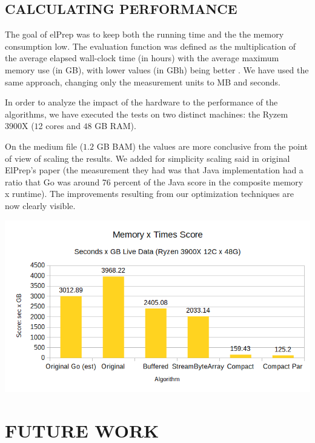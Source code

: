 \documentclass[a4paper,twoside]{article}
\begin{document}
 
\subsection{\uppercase{Calculating Performance}}
\label{subsec:performance}
The goal of elPrep was to keep both the running time and the the memory consumption low. The evaluation function was defined as the multiplication of the average elapsed wall-clock time (in hours) with the average maximum memory use (in GB), with lower values (in GBh) being better \cite{costanza:2019}.
We have used the same approach, changing only the measurement units to MB and seconds.

In order to analyze the impact of the hardware to the performance of the algorithms, we have executed the tests on two distinct machines: the Ryzem 3900X ($1$2 cores and $48$ GB RAM).

On the medium file ($1.2$ GB BAM) the values are more conclusive from the point of view of scaling the results. We added for simplicity scaling said in original ElPrep's paper (the measurement they had was that Java implementation had a ratio that Go was around 76 percent of the Java score in the composite memory x runtime). The improvements resulting from our optimization techniques are now clearly visible. 

\begin{center}
	\includegraphics[scale=0.5]{images/times_and_memory_chart.png}
\end{center}


\section{\uppercase{Future work}}
\label{sec:future}
\end{document}
